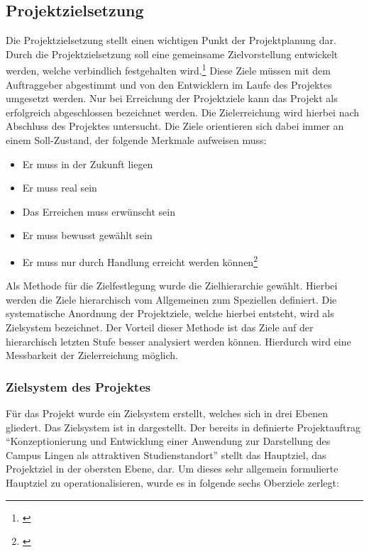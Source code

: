 \subsection{Projektzielsetzung}
\label{sec:Projektzielsetzung}

Die Projektzielsetzung stellt einen wichtigen Punkt der Projektplanung dar.
Durch die Projektzielsetzung soll eine gemeinsame Zielvorstellung entwickelt
werden, welche verbindlich festgehalten wird.\footnote{\citet[S.~34]{litke2007}}
Diese Ziele müssen mit dem Auftraggeber abgestimmt und von den Entwicklern im
Laufe des Projektes umgesetzt werden. Nur bei Erreichung der Projektziele kann
das Projekt als erfolgreich abgeschlossen bezeichnet werden. Die Zielerreichung
wird hierbei nach Abschluss des Projektes untersucht. Die Ziele orientieren
sich dabei immer an einem Soll-Zustand, der folgende Merkmale aufweisen muss:

\begin{itemize}
  \item Er muss in der Zukunft liegen
  \item Er muss real sein
  \item Das Erreichen muss erwünscht sein
  \item Er muss bewusst gewählt sein
  \item Er muss nur durch Handlung erreicht werden
  können\footnote{\citet[S.~33]{litke2007}}
\end{itemize}

Als Methode für die Zielfestlegung wurde die Zielhierarchie gewählt. Hierbei
werden die Ziele hierarchisch vom Allgemeinen zum Speziellen definiert. Die
systematische Anordnung der Projektziele, welche hierbei entsteht, wird als
Zielsystem bezeichnet. Der Vorteil dieser Methode ist das Ziele auf der
hierarchisch letzten Stufe besser analysiert werden können. Hierdurch wird eine
Messbarkeit der Zielerreichung möglich. 

\subsubsection{Zielsystem des Projektes}
\label{sec:Zielsystem}

Für das Projekt wurde ein Zielsystem erstellt, welches sich in drei Ebenen
gliedert. Das Zielsystem ist in  dargestellt. Der bereits in
 definierte Projektauftrag "`Konzeptionierung und
Entwicklung einer Anwendung zur Darstellung des Campus Lingen als attraktiven
Studienstandort"' stellt das Hauptziel, das Projektziel in der obersten Ebene,
dar. Um dieses sehr allgemein formulierte Hauptziel zu operationalisieren, wurde
es in folgende sechs Oberziele zerlegt:

